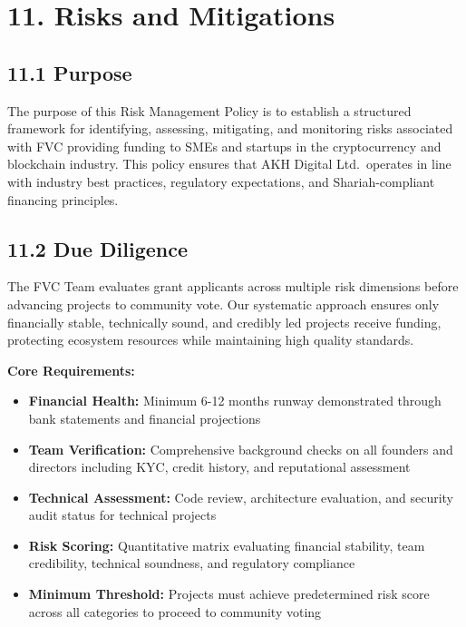 \documentclass[
  paper=a4,
  ,captions=tableheading
]{scrartcl}
\providecommand{\tightlist}{%
  \setlength{\itemsep}{0pt}\setlength{\parskip}{0pt}}
\begin{document}
\section{11. Risks and Mitigations}\label{risks-and-mitigations}

\subsection{11.1 Purpose}\label{purpose}

The purpose of this Risk Management Policy is to establish a structured
framework for identifying, assessing, mitigating, and monitoring risks
associated with FVC providing funding to SMEs and startups in the cryptocurrency and blockchain
industry. This policy ensures that AKH Digital Ltd.~operates in line
with industry best practices, regulatory expectations, and
Shariah-compliant financing principles.

\subsection{11.2 Due Diligence}\label{due-diligence}

The FVC Team evaluates grant applicants across multiple risk dimensions
before advancing projects to community vote. Our systematic approach
ensures only financially stable, technically sound, and credibly led
projects receive funding, protecting ecosystem resources while
maintaining high quality standards.

\textbf{Core Requirements:}

\begin{itemize}
\tightlist
\item
  \textbf{Financial Health:} Minimum 6-12 months runway demonstrated
  through bank statements and financial projections
\item
  \textbf{Team Verification:} Comprehensive background checks on all
  founders and directors including KYC, credit history, and reputational
  assessment
\item
  \textbf{Technical Assessment:} Code review, architecture evaluation,
  and security audit status for technical projects
\item
  \textbf{Risk Scoring:} Quantitative matrix evaluating financial
  stability, team credibility, technical soundness, and regulatory
  compliance
\item
  \textbf{Minimum Threshold:} Projects must achieve predetermined risk
  score across all categories to proceed to community voting
\end{itemize}
\end{document}
